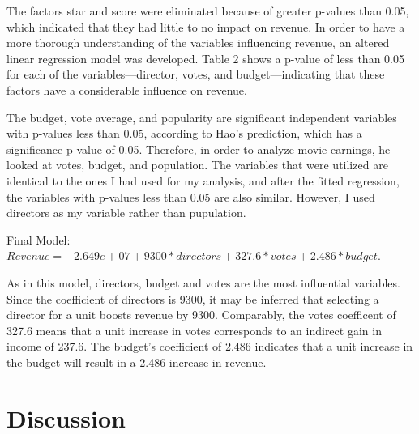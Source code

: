 \documentclass[12pt]{article}
\begin{document}
The factors star and score were eliminated because of greater p-values than 0.05, 
which indicated that they had little to no impact on revenue. In order to have a 
more thorough understanding of the variables influencing revenue, an altered linear 
regression model was developed. Table 2 shows a p-value of less than 0.05 for each 
of the variables—director, votes, and budget—indicating that these factors have a
considerable influence on revenue.

The budget, vote average, and popularity are significant independent variables with
p-values less than 0.05, according to Hao's prediction, which has a significance p-value
of 0.05. Therefore, in order to analyze movie earnings, he looked at votes, budget, and 
population. The variables that were utilized are identical to the ones I had used for my 
analysis, and after the fitted regression, the variables with p-values less than 0.05 are
also similar. However, I used directors as my variable rather than pupulation.

Final Model: 
$Revenue = -2.649e+07 +9300*directors + 327.6*votes + 2.486*budget$.


As in this model, directors, budget and votes are the most influential variables.
Since the coefficient of directors is 9300, it may be inferred that selecting a 
director for a unit boosts revenue by 9300. Comparably, the votes coefficent of 
327.6 means that a unit increase in votes corresponds to an indirect gain in income 
of 237.6. The budget's coefficient of 2.486 indicates that a unit increase in the 
budget will result in a 2.486 increase in revenue.



\section{Discussion}
\label{sec:dis}





\end{document}
